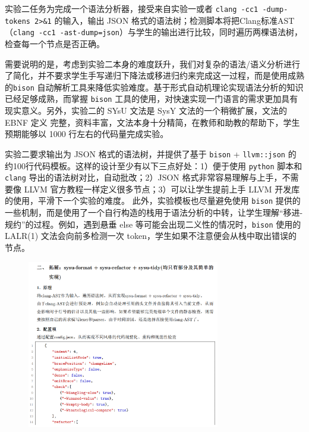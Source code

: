 \documentclass{SCIS2020cn}
\begin{document}
实验二任务为完成一个语法分析器，接受来自实验一或者 \texttt{clang -cc1 -dump-tokens 2>\&1} 的输入，输出 JSON 格式的语法树；检测脚本将把Clang标准AST（\texttt{clang -cc1 -ast-dump=json}）与学生的输出进行比较，同时遍历两棵语法树，检查每一个节点是否正确。

需要说明的是，考虑到实验二本身的难度跃升，我们对复杂的语法/语义分析进行了简化，并不要求学生手写递归下降法或移进归约来完成这一过程，而是使用成熟的\texttt{bison} 自动解析工具来降低实验难度。基于形式自动机理论实现语法分析的知识已经足够成熟，而掌握 \texttt{bison} 工具的使用，对快速实现一门语言的需求更加具有现实意义。另外，实验二的 SYsU 文法是 SysY 文法的一个稍微扩展，文法的 EBNF 定义\cite{sysy} 完整，资料丰富，文法本身十分精简，在教师和助教的帮助下，学生预期能够以 1000 行左右的代码量完成实验。

实验二要求输出为 JSON 格式的语法树，并提供了基于 \texttt{bison} + \texttt{llvm::json} 的约100行代码模板。这样的设计至少有以下三点好处：1）便于使用 \texttt{python} 脚本和 \texttt{clang} 导出的语法树对比，自动批改；2）JSON 格式非常容易理解与上手，不需要像 LLVM 官方教程\cite{llvm_manual1}一样定义很多节点；3）可以让学生提前上手 LLVM 开发库的使用，平滑下一个实验的难度。
此外，实验模板也尽量避免使用 \texttt{bison} 提供的一些机制，而是使用了一个自行构造的栈用于语法分析的中转，让学生理解``移进-规约''的过程。例如，遇到悬垂 else 等可能会出现二义性的情况时，\texttt{bison} 使用的 LALR(1) 文法会向前多检测一次 token，学生如果不注意便会从栈中取出错误的节点。

\begin{figure}
    \centering
    \includegraphics[width=0.75\textwidth]{assets/image/report1}
    \label{report1}
\end{figure}
\end{document}
